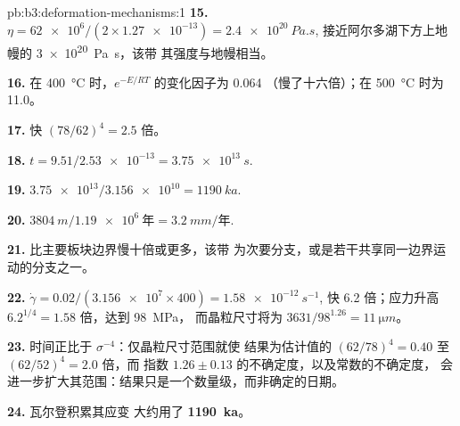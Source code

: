 \begin{solution}{pb:b3:deformation-mechanisms:1}
\textbf{15.} $\eta = \num{62e6}/(2\times\num{1.27e-13}) = \qty{2.4e20}{Pa.s}$,
接近阿尔多湖下方上地幔的 \qty{3e20}{Pa.s}，该带
其强度与地幔相当。

\textbf{16.} 在 \qty{400}{\celsius} 时，$e^{-E/RT}$ 的变化因子为 0.064
（慢了十六倍）；在 \qty{500}{\celsius} 时为 11.0。

\textbf{17.} 快 $(78/62)^4 = 2.5$ 倍。

\textbf{18.} $t = 9.51/\num{2.53e-13} = \qty{3.75e13}{s}$.

\textbf{19.} $\num{3.75e13}/\num{3.156e10} = \qty{1190}{ka}$.

\textbf{20.} $\qty{3804}{m}/\qty{1.19e6}{\text{年}} = \qty{3.2}{mm/\text{年}}$.

\textbf{21.} 比主要板块边界慢十倍或更多，该带
为次要分支，或是若干共享同一边界运动的分支之一。

\textbf{22.} $\dot\gamma = 0.02/(\num{3.156e7}\times400) = \qty{1.58e-12}{s^{-1}}$,
快 6.2 倍；应力升高 $6.2^{1/4} = 1.58$ 倍，达到 \qty{98}{MPa}，
而晶粒尺寸将为 $3631/98^{1.26} = \qty{11}{\micro m}$。

\textbf{23.} 时间正比于 $\sigma^{-4}$：仅晶粒尺寸范围就使
结果为估计值的 $(62/78)^4 = 0.40$ 至 $(62/52)^4 = 2.0$ 倍，而
指数 $1.26 \pm 0.13$ 的不确定度，以及常数的不确定度，
会进一步扩大其范围：结果只是一个数量级，而非确定的日期。

\textbf{24.} 瓦尔登积累其应变
大约用了 \textbf{\qty[text-series-to-math=true]{1190}{ka}}。
\end{solution}
